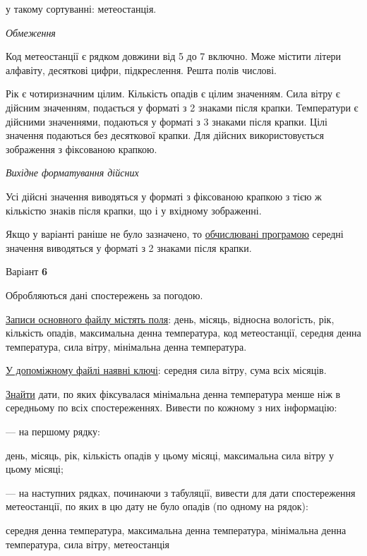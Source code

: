 \documentclass[11pt, ukrainian]{article}
\begin{document}
{\noindent}у такому сортуванні: метеостанція.


\bigskip\textit{Обмеження}

Код метеостанції є рядком довжини від 5 до 7 включно.
Може містити літери алфавіту, десяткові цифри, підкреслення. Решта полів числові.

Рік є чотиризначним цілим.
Кількість опадів є цілим значенням.
Сила вітру є дійсним значенням, подається у форматі з 2 знаками після крапки.
Температури є дійсними значеннями, подаються у форматі з 3 знаками після крапки.
Цілі значення подаються без десяткової крапки.
Для дійсних використовується зображення з фіксованою крапкою.

\textit{Вихідне форматування дійсних}

Усі дійсні значення виводяться у форматі з фіксованою крапкою з тією ж кількістю знаків після крапки, що і у вхідному зображенні.

Якщо у варіанті раніше не було зазначено, то \underline{обчислювані програмою} середні значення виводяться у форматі з 2 знаками після крапки.


\par
\newpage
{\center Варіант  \No \textbf { 6 }\par}
\bigskip
Обробляються дані спостережень за погодою. 

\underline{Записи основного файлу містять поля}: день, місяць, відносна вологість, рік, кількість опадів, максимальна денна температура, код метеостанції, середня денна температура, сила вітру, мінімальна денна температура.

\underline{У допоміжному файлі наявні ключі}: середня сила вітру, сума всіх місяців.

\underline{Знайти} дати, по яких фіксувалася мінімальна денна температура менше ніж в середньому по всіх спостереженнях. Вивести по кожному з них інформацію:\par
{\noindent}--- на першому рядку:\par
день, місяць, рік, кількість опадів у цьому місяці, максимальна сила вітру у цьому місяці;

{\noindent}--- на наступних рядках, починаючи з табуляції, вивести для дати спостереження метеостанції, по яких в цю дату не було опадів (по одному на рядок):\par
середня денна температура, максимальна денна температура, мінімальна денна температура, сила вітру, метеостанція
\end{document}
